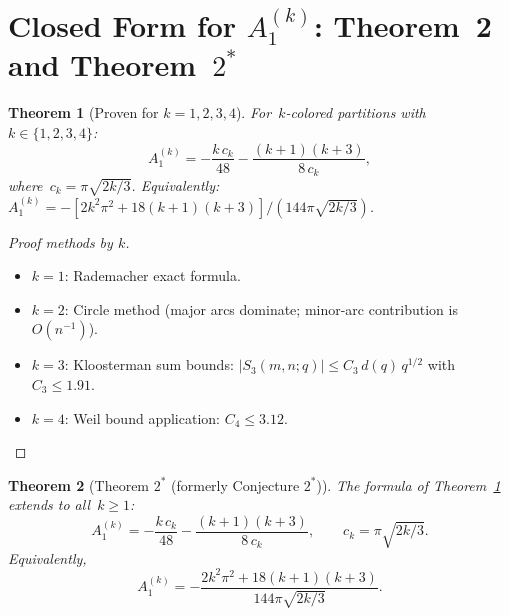 \documentclass[11pt,a4paper]{article}
\newtheorem{theorem}{Theorem}[section]
\begin{document}
\section{Closed Form for \texorpdfstring{$A_1^{(k)}$}{A1(k)}: Theorem~2 and Theorem~\texorpdfstring{$2^*$}{2*}}\label{sec:theorem2}

\begin{theorem}[Proven for $k = 1, 2, 3, 4$]\label{thm:A1k}
For~$k$-colored partitions with~$k \in \{1,2,3,4\}$:
\begin{equation}\label{eq:A1k}
  A_1^{(k)} = -\frac{k\,c_k}{48} - \frac{(k+1)(k+3)}{8\,c_k},
\end{equation}
where~$c_k = \pi\sqrt{2k/3}$.
Equivalently:~$A_1^{(k)} = -[2k^2\pi^2 + 18(k+1)(k+3)]/(144\pi\sqrt{2k/3})$.
\end{theorem}

\begin{proof}[Proof methods by $k$]
\begin{itemize}
  \item $k=1$: Rademacher exact formula.
  \item $k=2$: Circle method (major arcs dominate; minor-arc contribution is $O(n^{-1})$).
  \item $k=3$: Kloosterman sum bounds: $|S_3(m,n;q)| \leq C_3\,d(q)\,q^{1/2}$ with $C_3 \leq 1.91$.
  \item $k=4$: Weil bound application: $C_4 \leq 3.12$.
\end{itemize}
\end{proof}

\begin{theorem}[Theorem $2^*$ (formerly Conjecture $2^*$)]\label{conj:2star}
The formula of Theorem~\ref{thm:A1k} extends to all~$k \geq 1$:
\[
  A_1^{(k)} = -\frac{k\,c_k}{48} - \frac{(k+1)(k+3)}{8\,c_k},
  \qquad c_k = \pi\sqrt{2k/3}.
\]
Equivalently,
\[
  A_1^{(k)} = -\frac{2k^2\pi^2 + 18(k+1)(k+3)}{144\pi\sqrt{2k/3}}.
\]
\end{theorem}
\end{document}
